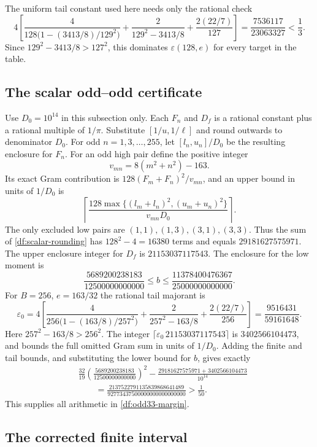 \documentclass[11pt,reqno]{amsart}
\numberwithin{equation}{section}
\begin{document}
The uniform tail constant used here needs only the rational check
\[
 4\left[
 \frac4{128\bigl(1-(3413/8)/129^2\bigr)}
 +\frac2{129^2-3413/8}+\frac{2(22/7)}{127}\right]
 =\frac{7536117}{23063327}<\frac13.
\]
Since $129^2-3413/8>127^2$, this dominates
$\varepsilon(128,e)$ for every target in the table.

\subsection{The scalar odd--odd certificate}

Use $D_0=10^{14}$ in this subsection only. Each $F_n$ and $D_f$ is a
rational constant plus a rational multiple of $1/\pi$. Substitute
$[1/u,1/\ell]$ and round outwards to denominator $D_0$.
For odd $n=1,3,\ldots,255$, let
$[l_n,u_n]/D_0$ be the resulting enclosure for $F_n$.
For an odd high pair define the positive integer
\[
 v_{mn}=8(m^2+n^2)-163.
\]
Its exact Gram contribution is
$128(F_m+F_n)^2/v_{mn}$, and an upper bound in units of $1/D_0$ is
\begin{equation}
 \left\lceil
 \frac{128\max\{(l_m+l_n)^2,(u_m+u_n)^2\}}
      {v_{mn}D_0}\right\rceil.
 \label{df:scalar-rounding}
\end{equation}
The only excluded low pairs are
$(1,1),(1,3),(3,1),(3,3)$. Thus the sum of
\eqref{df:scalar-rounding} has $128^2-4=16380$ terms and equals
$29181627575971$. The upper enclosure integer for $D_f$ is
$21153037117543$. The enclosure for the low moment is
\[
 \frac{5689200238183}{12500000000000}
 \le b\le
 \frac{11378400476367}{25000000000000}.
\]
For $B=256$, $e=163/32$ the rational tail majorant is
\[
 \varepsilon_0=
 4\left[
 \frac4{256\bigl(1-(163/8)/257^2\bigr)}
 +\frac2{257^2-163/8}+\frac{2(22/7)}{256}\right]
 =\frac{9516431}{59161648}.
\]
Here $257^2-163/8>256^2$. The integer
$\lceil\varepsilon_0\,21153037117543\rceil$
is $3402566104473$, and bounds the full omitted Gram sum in units of
$1/D_0$. Adding the finite and tail bounds, and substituting the
lower bound for $b$, gives exactly
\[
\begin{aligned}
 &\frac{32}{19}
 \left(\frac{5689200238183}{12500000000000}\right)^2
 -\frac{29181627575971+3402566104473}{10^{14}}\\
 &\qquad=\frac{2137522791135839868641489}
        {92773437500000000000000000}>\frac1{50}.
\end{aligned}
\]
This supplies all arithmetic in \eqref{df:odd33-margin}.

\subsection{The corrected finite interval}
\end{document}
